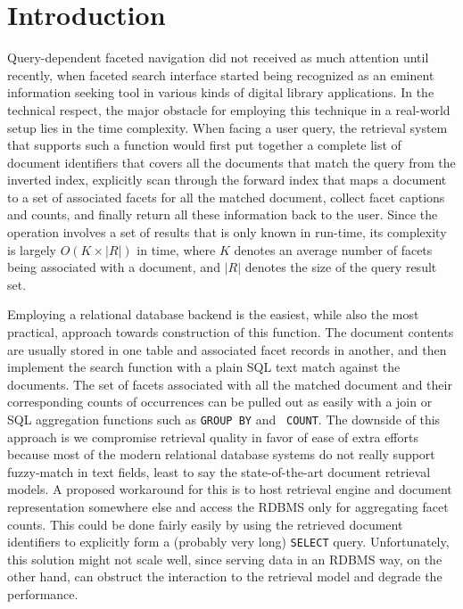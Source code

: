 \section{Introduction}


Query-dependent faceted navigation did not received as much attention until
recently, when faceted search interface started being recognized as an eminent
information seeking tool in various kinds of digital library applications.  In
the technical respect, the major obstacle for employing this technique in a
real-world setup lies in the time complexity.  When facing a user query, the
retrieval system that supports such a function would first put together a
complete list of document identifiers that covers all the documents that match
the query from the inverted index, explicitly scan through the forward index
that maps a document to a set of associated facets for all the matched
document, collect facet captions and counts, and finally return all these
information back to the user.  Since the operation involves a set of results
that is only known in run-time, its complexity is largely $O(K \times |R|)$ in
time, where $K$ denotes an average number of facets being associated with a
document, and $|R|$ denotes the size of the query result set.  

Employing a relational database backend is the easiest, while also the most
practical, approach towards construction of this function.  The document
contents are usually stored in one table and associated facet records in
another, and then implement the search function with a plain SQL text match
against the documents.  The set of facets associated with all the matched
document and their corresponding counts of occurrences can be pulled out as
easily with a join or SQL aggregation functions such as {\tt GROUP BY} and {\tt
COUNT}.  The downside of this approach is we compromise retrieval quality in
favor of ease of extra efforts because most of the modern relational database
systems do not really support fuzzy-match in text fields, least to say the
state-of-the-art document retrieval models.  A proposed workaround for this is
to host retrieval engine and document representation somewhere else and access
the RDBMS only for aggregating facet counts.  This could be done fairly easily
by using the retrieved document identifiers to explicitly form a (probably very
long) {\tt SELECT} query.  Unfortunately, this solution might not scale well,
since serving data in an RDBMS way, on the other hand, can obstruct the
interaction to the retrieval model and degrade the performance.

